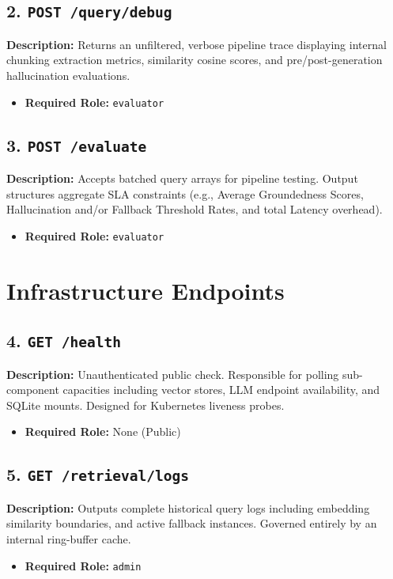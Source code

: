 \documentclass[11pt,a4paper]{article}
\begin{document}
\subsection{2. \texttt{POST /query/debug}}
\textbf{Description:} Returns an unfiltered, verbose pipeline trace displaying internal chunking extraction metrics, similarity cosine scores, and pre/post-generation hallucination evaluations.
\begin{itemize}
    \item \textbf{Required Role:} \texttt{evaluator}
\end{itemize}

\subsection{3. \texttt{POST /evaluate}}
\textbf{Description:} Accepts batched query arrays for pipeline testing. Output structures aggregate SLA constraints (e.g., Average Groundedness Scores, Hallucination and/or Fallback Threshold Rates, and total Latency overhead).
\begin{itemize}
    \item \textbf{Required Role:} \texttt{evaluator}
\end{itemize}

\section{Infrastructure Endpoints}

\subsection{4. \texttt{GET /health}}
\textbf{Description:} Unauthenticated public check. Responsible for polling sub-component capacities including vector stores, LLM endpoint availability, and SQLite mounts. Designed for Kubernetes liveness probes.
\begin{itemize}
    \item \textbf{Required Role:} None (Public)
\end{itemize}

\subsection{5. \texttt{GET /retrieval/logs}}
\textbf{Description:} Outputs complete historical query logs including embedding similarity boundaries, and active fallback instances. Governed entirely by an internal ring-buffer cache.
\begin{itemize}
    \item \textbf{Required Role:} \texttt{admin}
\end{itemize}
\end{document}
